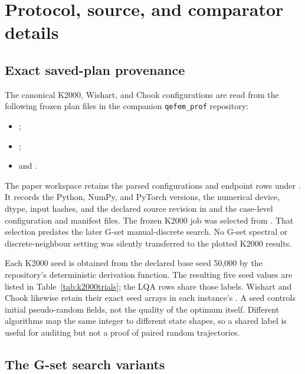 \section{Protocol, source, and comparator details}
\label{app:protocols}

\subsection{Exact saved-plan provenance}

The canonical K2000, Wishart, and Chook configurations are read from
the following frozen plan files in the companion \texttt{qefem\_prof}
repository:
\begingroup\footnotesize
\begin{itemize}[leftmargin=2em]
 \item {};
 \item {};
 \item {}
       and .
\end{itemize}
\endgroup
The paper workspace retains the parsed configurations and endpoint rows
under . It records the Python, NumPy, and PyTorch
versions, the numerical device, dtype, input hashes, and the declared
source revision in  and the
case-level configuration and manifest files. The frozen K2000
\QeFEM{} job was selected from .
That selection predates the later G-set manual-discrete search. No
G-set spectral or discrete-neighbour setting was silently transferred
to the plotted K2000 results.

Each K2000 seed is obtained from the declared base seed 50,000 by the
repository's deterministic derivation function. The resulting five
seed values are listed in Table~\ref{tab:k2000trials}; the LQA rows
share those labels. Wishart and Chook likewise retain their exact seed
arrays in each instance's . A seed controls
initial pseudo-random fields, not the quality of the optimum itself.
Different algorithms map the same integer to different state shapes,
so a shared label is useful for auditing but not a proof of paired
random trajectories.

\subsection{The G-set search variants}

